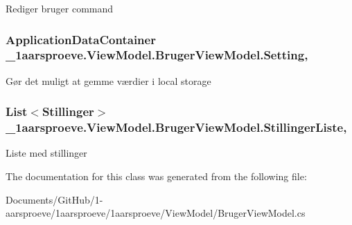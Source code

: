 Rediger bruger command 

\hypertarget{class__1aarsproeve_1_1_view_model_1_1_bruger_view_model_ac9e91065596a741027a1b88853bd76e6}{}
\subsubsection[{Setting}]{\setlength{\rightskip}{0pt plus 5cm}Application\+Data\+Container \+\_\+1aarsproeve.\+View\+Model.\+Bruger\+View\+Model.\+Setting\hspace{0.3cm}{\ttfamily [get]}, {\ttfamily [set]}}\label{class__1aarsproeve_1_1_view_model_1_1_bruger_view_model_ac9e91065596a741027a1b88853bd76e6}


Gør det muligt at gemme værdier i local storage 

\hypertarget{class__1aarsproeve_1_1_view_model_1_1_bruger_view_model_ac5c316878e65e35da6706ecf6623a864}{}
\subsubsection[{Stillinger\+Liste}]{\setlength{\rightskip}{0pt plus 5cm}List$<${\bf Stillinger}$>$ \+\_\+1aarsproeve.\+View\+Model.\+Bruger\+View\+Model.\+Stillinger\+Liste\hspace{0.3cm}{\ttfamily [get]}, {\ttfamily [set]}}\label{class__1aarsproeve_1_1_view_model_1_1_bruger_view_model_ac5c316878e65e35da6706ecf6623a864}


Liste med stillinger 



The documentation for this class was generated from the following file\+:\begin{DoxyCompactItemize}
\item 
Documents/\+Git\+Hub/1-\/aarsproeve/1aarsproeve/1aarsproeve/\+View\+Model/Bruger\+View\+Model.\+cs\end{DoxyCompactItemize}
